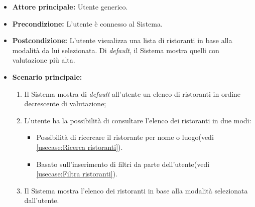 \label{usecase:Consultazione elenco ristoranti}
\begin{itemize}
	\item \textbf{Attore principale:} Utente generico.

	\item \textbf{Precondizione:}
	      L'utente è connesso al Sistema.

	\item \textbf{Postcondizione:} L'utente visualizza una lista di ristoranti in base alla modalità da lui selezionata.
    Di \textit{default}, il Sistema mostra quelli con valutazione più alta.

	\item \textbf{Scenario principale:}
	      \begin{enumerate}
              \item Il Sistema mostra di \textit{default} all'utente un elenco di ristoranti in ordine decrescente di valutazione;
              
		      \item L'utente ha la possibilità di consultare l'elenco dei ristoranti in due modi:
		      \begin{itemize}
                \item Possibilità di ricercare il ristorante per nome o luogo(vedi \autoref{usecase:Ricerca ristoranti}).
                \item Basato sull'inserimento di filtri da parte dell'utente(vedi \autoref{usecase:Filtra ristoranti}).
              \end{itemize}

		      \item Il Sistema mostra l'elenco dei ristoranti in base alla modalità selezionata dall'utente.
		    
	      \end{enumerate}
\end{itemize}

